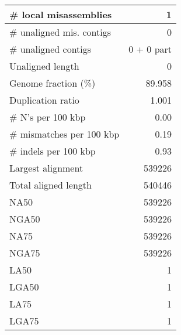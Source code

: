 \documentclass[12pt,a4paper]{article}
\begin{document}
\begin{table}[ht]
\begin{center}
\begin{tabular}{|l*{1}{|r}|}
\# local misassemblies & 1 \\ \hline
\# unaligned mis. contigs & 0 \\ \hline
\# unaligned contigs & 0 + 0 part \\ \hline
Unaligned length & 0 \\ \hline
Genome fraction (\%) & 89.958 \\ \hline
Duplication ratio & 1.001 \\ \hline
\# N's per 100 kbp & 0.00 \\ \hline
\# mismatches per 100 kbp & 0.19 \\ \hline
\# indels per 100 kbp & 0.93 \\ \hline
Largest alignment & 539226 \\ \hline
Total aligned length & 540446 \\ \hline
NA50 & 539226 \\ \hline
NGA50 & 539226 \\ \hline
NA75 & 539226 \\ \hline
NGA75 & 539226 \\ \hline
LA50 & 1 \\ \hline
LGA50 & 1 \\ \hline
LA75 & 1 \\ \hline
LGA75 & 1 \\ \hline
\end{tabular}
\end{center}
\end{table}
\end{document}
